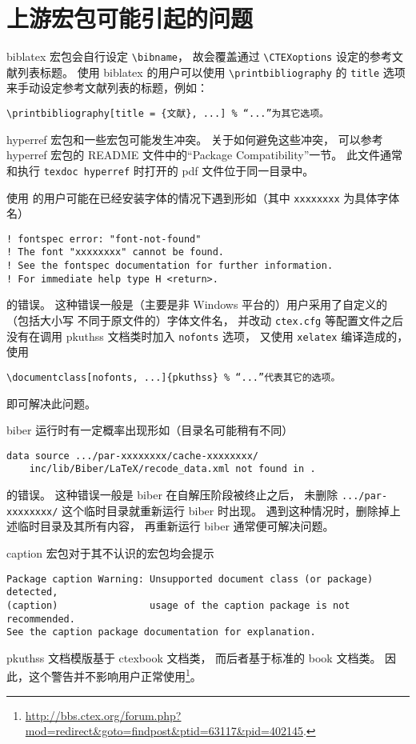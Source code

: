 	\section{上游宏包可能引起的问题}

	biblatex\supercite{biblatex} 宏包会自行设定 \verb|\bibname|，
	故会覆盖通过 \verb|\CTEXoptions| 设定的参考文献列表标题。
	使用 biblatex 的用户可以使用 \verb|\printbibliography| 的
	\verb|title| 选项来手动设定参考文献列表的标题，例如：
\begin{Verbatim}[frame = single]
\printbibliography[title = {文献}, ...] % “...”为其它选项。
\end{Verbatim}

	hyperref\supercite{hyperref} 宏包和一些宏包可能发生冲突。
	关于如何避免这些冲突，
	可以参考 hyperref 宏包的 README 文件中的“Package Compatibility”一节。
	此文件通常和执行 \verb|texdoc hyperref| %
	时打开的 pdf 文件位于同一目录中。

	使用  的用户可能在已经安装字体的情况下遇到形如（其中
	\verb|xxxxxxxx| 为具体字体名）
\begin{Verbatim}[frame = single, fontsize = {\small}]
! fontspec error: "font-not-found"
! The font "xxxxxxxx" cannot be found.
! See the fontspec documentation for further information.
! For immediate help type H <return>.
\end{Verbatim}
	的错误。
	这种错误一般是（主要是非 Windows 平台的）用户采用了自定义的（包括大小写
	不同于原文件的）字体文件名，
	并改动 \verb|ctex.cfg| 等配置文件之后没有在调用 %
	pkuthss 文档类时加入 \verb|nofonts| 选项，
	又使用 \verb|xelatex| 编译造成的，使用
\begin{Verbatim}[frame = single]
\documentclass[nofonts, ...]{pkuthss} % “...”代表其它的选项。
\end{Verbatim}
	即可解决此问题。

	biber 运行时有一定概率出现形如（目录名可能稍有不同）
\begin{Verbatim}[frame = single, fontsize = {\small}]
data source .../par-xxxxxxxx/cache-xxxxxxxx/
	inc/lib/Biber/LaTeX/recode_data.xml not found in .
\end{Verbatim}
	的错误。
	这种错误一般是 biber 在自解压阶段被终止之后，
	未删除 \verb|.../par-xxxxxxxx/| 这个临时目录就重新运行 biber 时出现。
	遇到这种情况时，删除掉上述临时目录及其所有内容，
	再重新运行 biber 通常便可解决问题。

	caption\supercite{caption} 宏包对于其不认识的宏包均会提示
\begin{Verbatim}[frame = single, fontsize = {\small}]
Package caption Warning: Unsupported document class (or package) detected,
(caption)                usage of the caption package is not recommended.
See the caption package documentation for explanation.
\end{Verbatim}
	pkuthss 文档模版基于 ctexbook 文档类，
	而后者基于标准的 book 文档类。
	因此，这个警告并不影响用户正常使用\footnote{%
		\url{http://bbs.ctex.org/forum.php?mod=redirect&goto=findpost&ptid=63117&pid=402145}.%
	}。

